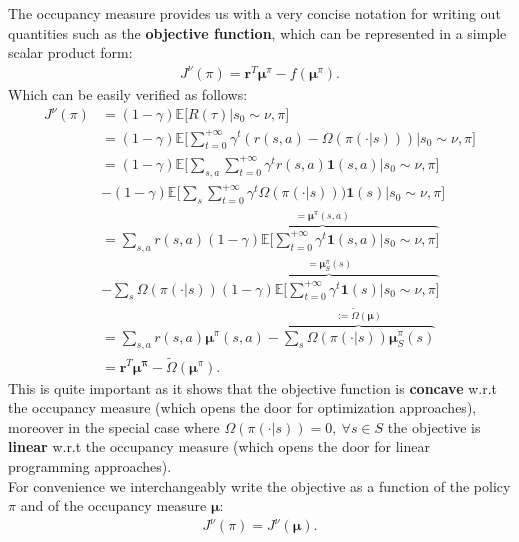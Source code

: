 \begin{observation}
    \label{obs:mu_pi_objective}
    The occupancy measure provides us with a very concise notation for writing out quantities such as the \textbf{objective function}, which can be represented in a simple scalar product form:
    \begin{align*}
        J^\nu(\pi) = \bm{r}^T \bm{\mu}^\pi - f(\bm{\mu}^\pi).
    \end{align*}
    Which can be easily verified as follows:
    \begin{align*}
        J^\nu(\pi) &= (1-\gamma)  \mathbb{E}\Big[ R(\tau) \Big| s_0 \sim \nu, \pi \Big] \\
                &=  (1-\gamma) \mathbb{E}\Bigg[ \sum_{t=0}^{+\infty} \gamma^t (r(s,a) - \Omega(\pi(\cdot|s))) \Big| s_0 \sim \nu, \pi \Bigg]\\
                &= (1-\gamma)  \mathbb{E}\Bigg[ \sum_{s,a} \sum_{t=0}^{+\infty} \gamma^t  r(s,a) \textbf{1}(s,a) \Big| s_0 \sim \nu, \pi \Bigg] \\& -  (1-\gamma)  \mathbb{E}\Bigg[ \sum_{s} \sum_{t=0}^{+\infty} \gamma^t \Omega(\pi(\cdot|s))) \textbf{1}(s) \Big| s_0 \sim \nu, \pi \Bigg]   \\
                &= \sum_{s,a} r(s,a)\overbrace{ (1-\gamma) \mathbb{E}\Bigg[  \sum_{t=0}^{+\infty}\gamma^t  \textbf{1}(s,a) \Big| s_0 \sim \nu, \pi \Bigg]}^{=\bm{\mu}^\pi(s,a)}\\
                &- \sum_{s} \Omega(\pi(\cdot|s)) \overbrace{ (1-\gamma) \mathbb{E}\Bigg[  \sum_{t=0}^{+\infty} \gamma^t \textbf{1}(s) \Big| s_0 \sim \nu, \pi \Bigg]}^{=\bm{\mu}_S^\pi(s)}\\
                &= \sum_{s,a} r(s,a) \bm{\mu}^\pi(s,a) - \overbrace{\sum_{s} \Omega(\pi(\cdot|s)) \bm{\mu}_S^\pi(s) }^{:=\tilde{\Omega}(\bm{\mu})}\\
                &=  \bm{r}^T \bm{\bm{\mu}^\pi} - \tilde{\Omega}(\bm{\bm{\mu}}^\pi).
    \end{align*}
    This is quite important as it shows that the objective function is \textbf{concave} w.r.t the occupancy measure (which opens the door for optimization approaches), moreover in the special case where $\Omega(\pi(\cdot|s)) = 0, ~\forall s \in S $ the objective is \textbf{linear} w.r.t the occupancy measure (which opens the door for linear programming approaches). \\
    For convenience we interchangeably write the objective as a function of the policy $\pi$ and of the occupancy measure $\bm{\mu}$:
    \begin{align*}
        J^\nu(\pi) =  J^\nu(\bm{\mu}).
    \end{align*}
\end{observation}


